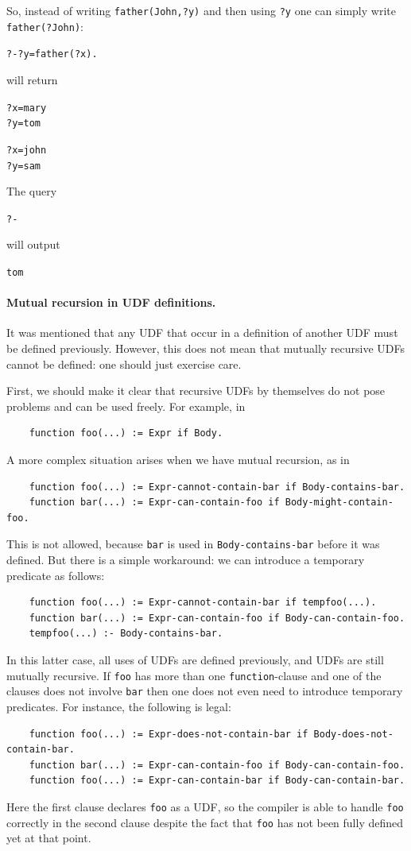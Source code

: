 \documentclass[11pt]{article}
\begin{document}
So, instead of writing \texttt{father(John,?y)}  and then using \texttt{?y}
one can simply write \texttt{father(?John)}:  
\begin{alltt}
    ?- ?y=father(?x).
\end{alltt}
will return
\begin{alltt}
    ?x=mary
    ?y=tom

    ?x=john
    ?y=sam
\end{alltt}
The query
\begin{alltt}
    ?- %
\end{alltt}
will output
\begin{alltt}
    tom
\end{alltt}

\paragraph{Mutual recursion in UDF definitions.}
It was mentioned that any UDF that occur in a definition of another UDF
must be defined previously. However, this does not mean that mutually
recursive UDFs cannot be defined: one should just exercise care.

First, we should make it clear that recursive UDFs by themselves do not
pose problems and can be used freely.  For example, in
\begin{verbatim}
    function foo(...) := Expr if Body.
\end{verbatim}
A more complex situation arises when we have mutual recursion, as in
\begin{verbatim}
    function foo(...) := Expr-cannot-contain-bar if Body-contains-bar.
    function bar(...) := Expr-can-contain-foo if Body-might-contain-foo.
\end{verbatim}
This is not allowed, because \texttt{bar} is used in
\texttt{Body-contains-bar} before it was defined.
But there is a simple workaround: we can introduce a
temporary predicate as follows:
\begin{verbatim}
    function foo(...) := Expr-cannot-contain-bar if tempfoo(...).
    function bar(...) := Expr-can-contain-foo if Body-can-contain-foo.
    tempfoo(...) :- Body-contains-bar.
\end{verbatim}
In this latter case, all uses of UDFs are defined previously, and UDFs are
still mutually recursive. If \texttt{foo} has more than one
\texttt{function}-clause and one of the clauses does not involve
\texttt{bar} then one does not even need to introduce temporary predicates. For
instance, the following is legal:   
\begin{verbatim}
    function foo(...) := Expr-does-not-contain-bar if Body-does-not-contain-bar.
    function bar(...) := Expr-can-contain-foo if Body-can-contain-foo.
    function foo(...) := Expr-can-contain-bar if Body-can-contain-bar.
\end{verbatim}
Here the first clause declares \texttt{foo} as a UDF, so the compiler is
able to handle \texttt{foo} correctly in the second clause despite the fact
that \texttt{foo} has not been fully defined yet at that point. 
\end{document}
